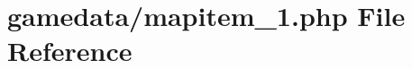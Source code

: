 \hypertarget{mapitem__1_8php}{\section{gamedata/mapitem\+\_\+1.php File Reference}
\label{mapitem__1_8php}
}
